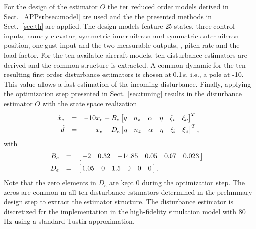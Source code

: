 \documentclass[graybox]{svmult}
\begin{document}
For the design of the estimator $O$  the ten reduced order models derived in Sect.~\ref{APPsubsec:model} are used 
and the the presented methods in Sect.~\ref{sec:th} are applied. The  design models  feature 25 states, three control inputs, namely elevator, symmetric inner aileron and symmetric outer aileron position, one gust input and the two measurable outputs, \ie,  pitch rate and the load factor. For the  ten available aircraft models, ten disturbance estimators are derived and the common structure is extracted.
A common dynamic for the ten resulting first order disturbance estimators is chosen at 0.1\,s, i.e., a pole at -10. This value allows a fast estimation of the incoming disturbance.
Finally, applying the optimization step presented in Sect.~\ref{sec:tuning}  results in the disturbance estimator $O$ with the state space realization
\begin{equation}\label{eq:obs}
	\begin{array}{rcr}
		\dot  x_e  &=& -10 x_e + B_e
		\begin{bmatrix}
			q & n_z & \alpha & \eta & \xi_i & \xi _o 
		\end{bmatrix}^T \,\,\, \vspace{+1mm} \\ 
		\tilde d &=&  x_e + 
		D_e
		\begin{bmatrix}
			q & n_z & \alpha & \eta & \xi_i & \xi _o 
		\end{bmatrix}^T,
	\end{array}
\end{equation}
with  
\begin{equation*}
\begin{array}{rcl}
B_e &=&
\begin{bmatrix}
  \, -2 &   0.32 &   -14.85 &   0.05 &   0.07 &  0.023 \,
\end{bmatrix}  \,\,\, \vspace{+2mm} \\
 D_e &=&
\begin{bmatrix}
  \, 0.05  &  0   &1.5 &0 &  0 &  0 \,
\end{bmatrix}. 
\end{array}
\end{equation*}
Note that the zero elements in $D_e$ are kept 0 during the  optimization step. The zeros are common in all ten disturbance estimators determined in the preliminary design step to extract the estimator structure.
The disturbance estimator is discretized for the implementation in the high-fidelity simulation model with 80\,Hz using a standard Tustin approximation.
\end{document}
